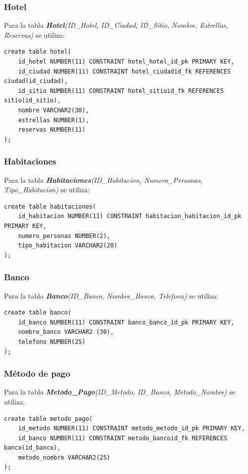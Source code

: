 \documentclass{article}
\begin{document}
\subsubsection{Hotel}

Para la tabla \textit{\textbf{Hotel}(ID\_Hotel, ID\_Ciudad, ID\_Sitio, Nombre, Estrellas, Reservas)} se utiliza:
\begin{lstlisting}
create table hotel(
    id_hotel NUMBER(11) CONSTRAINT hotel_hotel_id_pk PRIMARY KEY,
    id_ciudad NUMBER(11) CONSTRAINT hotel_ciudadid_fk REFERENCES ciudad(id_ciudad),
    id_sitio NUMBER(11) CONSTRAINT hotel_sitioid_fk REFERENCES sitio(id_sitio),
    nombre VARCHAR2(30),
    estrellas NUMBER(1),
    reservas NUMBER(11)
);
\end{lstlisting}

\subsubsection{Habitaciones}

Para la tabla \textit{\textbf{Habitaciones}(ID\_Habitacion, Numero\_Personas, Tipo\_Habitacion)} se utiliza:
\begin{lstlisting}
create table habitaciones(
    id_habitacion NUMBER(11) CONSTRAINT habitacion_habitacion_id_pk PRIMARY KEY,
    numero_personas NUMBER(2),
    tipo_habitacion VARCHAR2(20)
);
\end{lstlisting}

\subsubsection{Banco}

Para la tabla \textit{\textbf{Banco}(ID\_Banco, Nombre\_Banco, Telefono)} se utiliza:
\begin{lstlisting}
create table banco(
    id_banco NUMBER(11) CONSTRAINT banco_banco_id_pk PRIMARY KEY,
    nombre_banco VARCHAR2 (30),
    telefono NUMBER(25)
);
\end{lstlisting}

\subsubsection{Método de pago}

Para la tabla \textit{\textbf{Metodo\_Pago}(ID\_Metodo, ID\_Banco, Metodo\_Nombre)} se utiliza:
\begin{lstlisting}
create table metodo_pago(
    id_metodo NUMBER(11) CONSTRAINT metodo_metodo_id_pk PRIMARY KEY,
    id_banco NUMBER(11) CONSTRAINT metodo_bancoid_fk REFERENCES banco(id_banco),
    metodo_nombre VARCHAR2(25)
);
\end{lstlisting}
\end{document}
